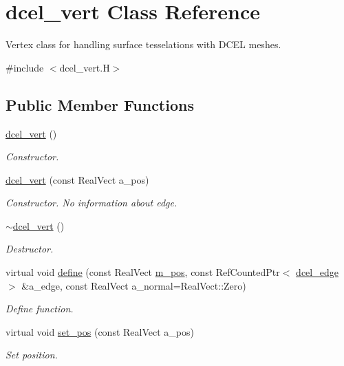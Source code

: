 \hypertarget{classdcel__vert}{}\section{dcel\+\_\+vert Class Reference}
\label{classdcel__vert}


Vertex class for handling surface tesselations with D\+C\+EL meshes.  




{\ttfamily \#include $<$dcel\+\_\+vert.\+H$>$}

\subsection*{Public Member Functions}
\begin{DoxyCompactItemize}
\item 
\hyperlink{classdcel__vert_a556a63585e0d9f06aa7bc68f9c9dc31a}{dcel\+\_\+vert} ()
\begin{DoxyCompactList}\small\item\em Constructor. \end{DoxyCompactList}\item 
\hyperlink{classdcel__vert_a2046f629e28857192d22c3621a03dfaf}{dcel\+\_\+vert} (const Real\+Vect a\+\_\+pos)
\begin{DoxyCompactList}\small\item\em Constructor. No information about edge. \end{DoxyCompactList}\item 
\hyperlink{classdcel__vert_a357e365a16c38f6f4906dd97925828b4}{$\sim$dcel\+\_\+vert} ()
\begin{DoxyCompactList}\small\item\em Destructor. \end{DoxyCompactList}\item 
virtual void \hyperlink{classdcel__vert_a3b96308435897638afa04d603769600c}{define} (const Real\+Vect \hyperlink{classdcel__vert_a837cb5cc7a7bc802a9a372a9e6d9263a}{m\+\_\+pos}, const Ref\+Counted\+Ptr$<$ \hyperlink{classdcel__edge}{dcel\+\_\+edge} $>$ \&a\+\_\+edge, const Real\+Vect a\+\_\+normal=Real\+Vect\+::\+Zero)
\begin{DoxyCompactList}\small\item\em Define function. \end{DoxyCompactList}\item 
virtual void \hyperlink{classdcel__vert_a9528031521ef84d334847b3e9d709e65}{set\+\_\+pos} (const Real\+Vect a\+\_\+pos)
\begin{DoxyCompactList}\small\item\em Set position. \end{DoxyCompactList}\item 

\end{DoxyCompactItemize}
